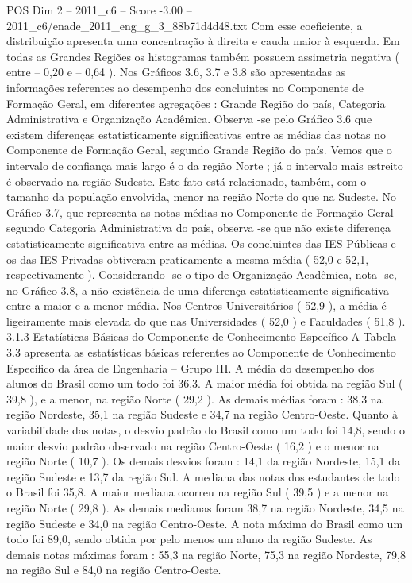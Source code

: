 \begin{textsample}{POS Dim 2 – 2011\_c6 – Score -3.00 – 2011\_c6/enade\_2011\_eng\_g\_3\_88b71d4d48.txt}
Com esse coeficiente, a distribuição apresenta uma concentração à direita e cauda maior à esquerda.
Em todas as Grandes Regiões os histogramas também possuem assimetria negativa ( entre – 0,20 e – 0,64 ).
Nos Gráficos 3.6, 3.7 e 3.8 são apresentadas as informações referentes ao desempenho dos concluintes no Componente de Formação Geral, em diferentes agregações : Grande Região do país, Categoria Administrativa e Organização Acadêmica.
Observa -se pelo Gráfico 3.6 que existem diferenças estatisticamente significativas entre as médias das notas no Componente de Formação Geral, segundo Grande Região do país.
Vemos que o intervalo de confiança mais largo é o da região Norte ; já o intervalo mais estreito é observado na região Sudeste.
Este fato está relacionado, também, com o tamanho da população envolvida, menor na região Norte do que na Sudeste.
No Gráfico 3.7, que representa as notas médias no Componente de Formação Geral segundo Categoria Administrativa do país, observa -se que não existe diferença estatisticamente significativa entre as médias.
Os concluintes das IES Públicas e os das IES Privadas obtiveram praticamente a mesma média ( 52,0 e 52,1, respectivamente ).
Considerando -se o tipo de Organização Acadêmica, nota -se, no Gráfico 3.8, a não existência de uma diferença estatisticamente significativa entre a maior e a menor média.
Nos Centros Universitários ( 52,9 ), a média é ligeiramente mais elevada do que nas Universidades ( 52,0 ) e Faculdades ( 51,8 ). 3.1.3 Estatísticas Básicas do Componente de Conhecimento Específico A Tabela 3.3 apresenta as estatísticas básicas referentes ao Componente de Conhecimento Específico da área de Engenharia – Grupo III.
A média do desempenho dos alunos do Brasil como um todo foi 36,3.
A maior média foi obtida na região Sul ( 39,8 ), e a menor, na região Norte ( 29,2 ).
As demais médias foram : 38,3 na região Nordeste, 35,1 na região Sudeste e 34,7 na região Centro-Oeste.
Quanto à variabilidade das notas, o desvio padrão do Brasil como um todo foi 14,8, sendo o maior desvio padrão observado na região Centro-Oeste ( 16,2 ) e o menor na região Norte ( 10,7 ).
Os demais desvios foram : 14,1 da região Nordeste, 15,1 da região Sudeste e 13,7 da região Sul.
A mediana das notas dos estudantes de todo o Brasil foi 35,8.
A maior mediana ocorreu na região Sul ( 39,5 ) e a menor na região Norte ( 29,8 ).
As demais medianas foram 38,7 na região Nordeste, 34,5 na região Sudeste e 34,0 na região Centro-Oeste.
A nota máxima do Brasil como um todo foi 89,0, sendo obtida por pelo menos um aluno da região Sudeste.
As demais notas máximas foram : 55,3 na região Norte, 75,3 na região Nordeste, 79,8 na região Sul e 84,0 na região Centro-Oeste.

\end{textsample}
